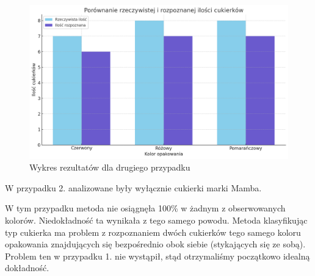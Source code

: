 \documentclass{article}
\begin{document}
\begin{figure}[H]
    \centering
    \includegraphics[width=\linewidth]{wykres2.png}
    \caption{Wykres rezultatów dla drugiego przypadku}
    \label{fig:przypadek2}
\end{figure}


W przypadku 2. analizowane były wyłącznie cukierki marki Mamba.


W tym przypadku metoda nie osiągnęła 100\% w żadnym z obserwowanych kolorów. Niedokładność ta wynikała z tego samego powodu. Metoda klasyfikując typ cukierka ma problem z rozpoznaniem dwóch cukierków tego samego koloru opakowania znajdujących się bezpośrednio obok siebie (stykających się ze sobą). Problem ten w przypadku 1. nie wystąpił, stąd otrzymaliśmy początkowo idealną dokładność.
\end{document}

